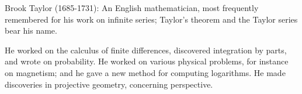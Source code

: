 Brook Taylor (1685-1731): An English mathematician, most frequently remembered
for his work on infinite series; Taylor's theorem and the Taylor series bear his
name.
\par
He worked on the calculus of finite differences, discovered integration by parts,
and wrote on probability. He worked on various physical problems, for instance on
magnetism; and he gave a new method for computing logarithms. He made discoveries
in projective geometry, concerning perspective.
